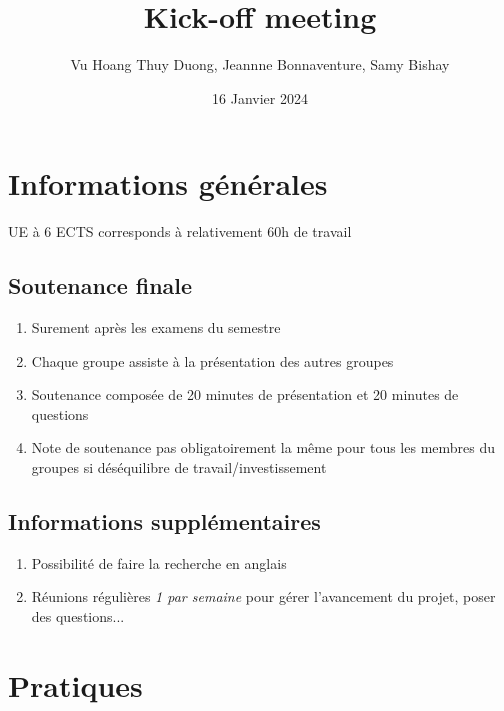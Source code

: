 \documentclass{article}
\title{Kick-off meeting}
\author{Vu Hoang Thuy Duong, Jeannne Bonnaventure, Samy Bishay}
\date{16 Janvier 2024}
\begin{document}
\maketitle

\section{Informations générales}
UE à 6 ECTS corresponds à relativement 60h de travail
\subsection{Soutenance finale}
\begin{enumerate}
    \item Surement après les examens du semestre
    \item Chaque groupe assiste à la présentation des autres groupes
    \item Soutenance composée de 20 minutes de présentation et 20 minutes de questions
    \item Note de soutenance pas obligatoirement la même pour tous les membres du groupes si déséquilibre de travail/investissement
\end{enumerate}
\subsection{Informations supplémentaires}
\begin{enumerate}
    \item Possibilité de faire la recherche en anglais
    \item Réunions régulières \textit{1 par semaine} pour gérer l'avancement du projet, poser des questions...
\end{enumerate}
\section{Pratiques}
\end{document}
